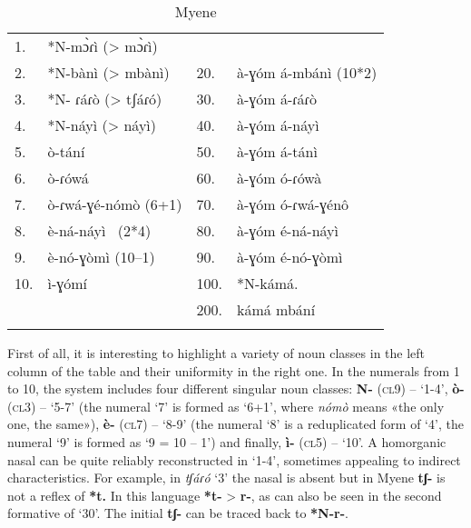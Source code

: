 \begin{table}
\caption{\label{tab:1:10} Myene }
\begin{tabularx}{\textwidth}{lXlX}
\lsptoprule

1. &*N-m{\`{ɔ}}ɾì (> m{\`{ɔ}}ɾì) & \\
2. &*N-b{\`{a}}nì (> mb{\`{a}}nì)  		& 20. &{\`{a}}-ɣ{\'{o}}m á-mbánì      (10*2)\\
3. &*N- ɾáɾ{\`{o}} (> tʃáɾ{\'{o}}) 		& 30. & {\`{a}}-ɣ{\'{o}}m á-ɾáɾ{\`{o}}\\
4. &*N-náyì  (> náyì)  		& 40. & {\`{a}}-ɣ{\'{o}}m á-náyì\\
5. &{\`{o}}-tání 				& 50. & {\`{a}}-ɣ{\'{o}}m á-tánì\\
6. &{\`{o}}-ɾ{\'{o}}wá 				& 60. & {\`{a}}-ɣ{\'{o}}m {\'{o}}-ɾ{\'{o}}w{\`{a}}\\
7. &{\`{o}}-ɾwá-ɣ{\'{e}}-n{\'{o}}m{\`{o}} (6+1) 	& 70. & {\`{a}}-ɣ{\'{o}}m {\'{o}}-ɾwá-ɣ{\'{e}}n{\^{o}}\\
8. &{\`{e}}-ná-náyì~   (2*4) 		& 80. & {\`{a}}-ɣ{\'{o}}m {\'{e}}-ná-náyì \\
9. &{\`{e}}-n{\'{o}}-ɣ{\`{o}}mì   (10–1) 		& 90. & {\`{a}}-ɣ{\'{o}}m {\'{e}}-n{\'{o}}-ɣ{\`{o}}mì\\
10.& ì-ɣ{\'{o}}mí ~ 			& 100.& *N-kámá. \\
   &           						& 200.& kámá mbání\\
\lspbottomrule
\end{tabularx}
\end{table}

First of all, it is interesting to highlight a variety of noun classes in the left column of the table and their uniformity in the right one. In the numerals from 1 to 10, the system includes four different singular noun classes: \textbf{N-} (\textsc{cl}9) – ‘1-4’, \textbf{{\`{o}}-} (\textsc{cl}3) – ‘5-7’ (the numeral ‘7’ is formed as ‘6+1’, where \textit{n{\'{o}}m{\`{o}}} means «the only one, the same»), \textbf{{\`{e}}-} (\textsc{cl}7) – ‘8-9’ (the numeral ‘8’  is a reduplicated form of ‘4’, the numeral ‘9’ is formed as ‘9 = 10 – 1’) and finally, \textbf{ì-} (\textsc{cl}5) – ‘10’. A homorganic nasal can be quite reliably reconstructed in ‘1-4’, sometimes appealing to indirect characteristics. For example, in \textit{tʃáɾ{\'{o}}} ‘3’ the nasal is absent but in Myene \textbf{tʃ-} is not a reflex of \textbf{*t.}  In this language  \textbf{*t-} > \textbf{r-}, as can also be seen in the second formative of ‘30’. The initial \textbf{tʃ-} can be traced back to \textbf{*N-r-}.

